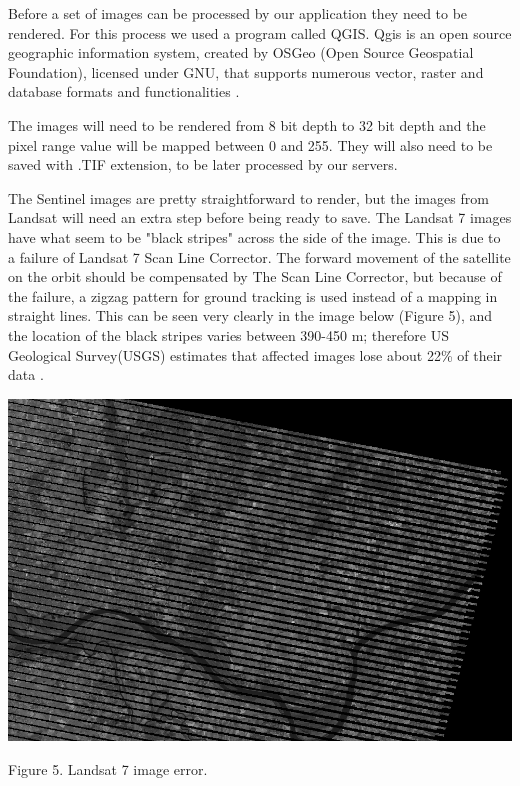 \documentclass[12pt, a4paper]{report}
\begin{document}
\quad
Before a set of images can be processed by our application they need to be rendered. For this process we used a program called QGIS. Qgis is an open source geographic information system, created by OSGeo (Open Source Geospatial Foundation), licensed under GNU, that supports numerous vector, raster and database formats and functionalities \cite{QGIS}.
\par 

The images will need to be rendered from 8 bit depth to 32 bit depth and the pixel range value will be mapped between 0 and 255. They will also need to be saved with .TIF extension, to be later processed by our servers.
\par 

The Sentinel images are pretty straightforward to render, but the images from Landsat will need an extra step before being ready to save. The Landsat 7 images have what seem to be "black stripes" across the side of the image. This is due to a failure of Landsat 7 Scan Line Corrector. The forward movement of the satellite on the orbit should be compensated by The Scan Line Corrector, but because of the failure, a zigzag pattern for ground tracking is used instead of a mapping in straight lines. This can be seen very clearly in the image below (Figure 5), and the location of the black stripes varies between 390-450 m; therefore US Geological Survey(USGS) estimates that affected images lose about 22\% of their data \cite{Landsat-error}.

\bigskip

\includegraphics[scale=0.54, center]{landsat_black_stripes.png} 
\begin{center}
Figure 5. Landsat 7 image error.
\end{center}
\par 
\end{document}
